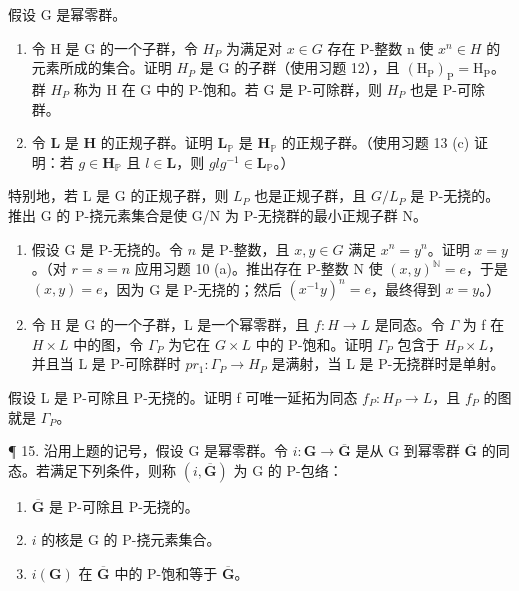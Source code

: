 假设 G 是幂零群。

\begin{enumerate}
\def\labelenumi{(\alph{enumi})}
\item
  令 H 是 G 的一个子群，令 \(H_{P}\) 为满足对 \(x \in G\) 存在 P-整数 n 使 \(x^{n} \in H\) 的元素所成的集合。证明 \(H_{P}\) 是 G 的子群（使用习题 12），且 \((\mathrm{H}_{\mathrm{P}})_{\mathrm{P}} = \mathrm{H}_{\mathrm{P}}\)。群 \(H_{P}\) 称为 H 在 G 中的 P-饱和。若 G 是 P-可除群，则 \(H_{P}\) 也是 P-可除群。
\item
  令 \(\mathbf{L}\) 是 \(\mathbf{H}\) 的正规子群。证明 \(\mathbf{L}_{\mathbb{P}}\) 是 \(\mathbf{H}_{\mathbb{P}}\) 的正规子群。（使用习题 13 (c) 证明：若 \(g \in \mathbf{H}_{\mathbb{P}}\) 且 \(l \in \mathbf{L}\)，则 \(glg^{-1} \in \mathbf{L}_{\mathbb{P}}\)。）
\end{enumerate}

特别地，若 L 是 G 的正规子群，则 \(L_{P}\) 也是正规子群，且 \(G/L_{P}\) 是 P-无挠的。推出 G 的 P-挠元素集合是使 G/N 为 P-无挠群的最小正规子群 N。

\begin{enumerate}
\def\labelenumi{(\alph{enumi})}
\setcounter{enumi}{2}
\item
  假设 G 是 P-无挠的。令 \(n\) 是 P-整数，且 \(x, y \in G\) 满足 \(x^n = y^n\)。证明 \(x = y\)。（对 \(r = s = n\) 应用习题 10 (a)。推出存在 P-整数 N 使 \((x, y)^{\mathbb{N}} = e\)，于是 \((x, y) = e\)，因为 G 是 P-无挠的；然后 \((x^{-1}y)^n = e\)，最终得到 \(x = y\)。）
\item
  令 H 是 G 的一个子群，L 是一个幂零群，且 \(f: H \to L\) 是同态。令 \(\Gamma\) 为 f 在 \(H \times L\) 中的图，令 \(\Gamma_{P}\) 为它在 \(G \times L\) 中的 P-饱和。证明 \(\Gamma_{P}\) 包含于 \(H_{P} \times L\)，并且当 L 是 P-可除群时 \(pr_{1}: \Gamma_{P} \to H_{P}\) 是满射，当 L 是 P-无挠群时是单射。
\end{enumerate}

假设 L 是 P-可除且 P-无挠的。证明 f 可唯一延拓为同态 \(f_{P}: H_{P} \to L\)，且 \(f_{P}\) 的图就是 \(\Gamma_{P}\)。

¶ 15. 沿用上题的记号，假设 G 是幂零群。令 \(i: \mathbf{G} \to \overline{\mathbf{G}}\) 是从 G 到幂零群 \(\overline{\mathbf{G}}\) 的同态。若满足下列条件，则称 \((i, \overline{\mathbf{G}})\) 为 G 的 P-包络：

\begin{enumerate}
\def\labelenumi{(\roman{enumi})}
\item
  \(\overline{\mathbf{G}}\) 是 P-可除且 P-无挠的。
\item
  \(i\) 的核是 G 的 P-挠元素集合。
\item
  \(i(\mathbf{G})\) 在 \(\overline{\mathbf{G}}\) 中的 P-饱和等于 \(\overline{\mathbf{G}}\)。
\end{enumerate}

